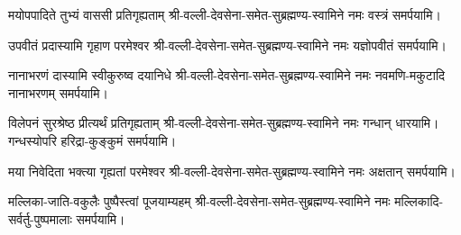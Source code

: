 {मयोपपादिते तुभ्यं वाससी प्रतिगृह्यताम्}
\nobreak%
श्री-वल्ली-देवसेना-समेत-सुब्रह्मण्य-स्वामिने
नमः वस्त्रं समर्पयामि।

{उपवीतं प्रदास्यामि गृहाण परमेश्वर}
\nobreak%
श्री-वल्ली-देवसेना-समेत-सुब्रह्मण्य-स्वामिने
नमः यज्ञोपवीतं समर्पयामि।

{नानाभरणं दास्यामि स्वीकुरुष्व दयानिधे}
\nobreak%
श्री-वल्ली-देवसेना-समेत-सुब्रह्मण्य-स्वामिने
नमः नवमणि-मकुटादि नानाभरणम् समर्पयामि।

{विलेपनं सुरश्रेष्ठ प्रीत्यर्थं प्रतिगृह्यताम्}
\nobreak%
श्री-वल्ली-देवसेना-समेत-सुब्रह्मण्य-स्वामिने
नमः गन्धान् धारयामि। गन्धस्योपरि हरिद्रा-कुङ्कुमं समर्पयामि।


{मया निवेदिता भक्त्या गृह्यतां परमेश्वर}
\nobreak%
श्री-वल्ली-देवसेना-समेत-सुब्रह्मण्य-स्वामिने
नमः अक्षतान् समर्पयामि।

{मल्लिका-जाति-वकुलैः पुष्पैस्त्वां पूजयाम्यहम्}
\nobreak%
श्री-वल्ली-देवसेना-समेत-सुब्रह्मण्य-स्वामिने
नमः मल्लिकादि-सर्वर्तु-पुष्पमालाः समर्पयामि।


